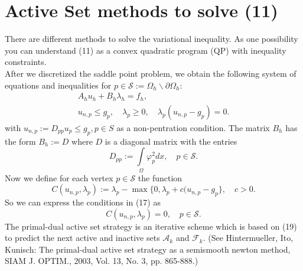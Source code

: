 \documentclass{article}
\begin{document}
\section{Active Set methods to solve (11)}

There are different methods to solve the variational inequality. As one possibility you can understand (11) as a convex quadratic program (QP) with inequality constraints.\\
After we discretized the saddle point problem, we obtain the following system of equations and inequalities for $p\in\mathcal{S}:=\Omega_h\backslash\partial\Omega_h$:
\begin{eqnarray}
 &A_h u_h + B_h\lambda_h = f_h,&\\
 &u_{n,p} \leq g_p,\quad \lambda_p \geq 0,\quad \lambda_p(u_{n,p} - g_p) = 0.&
\end{eqnarray}
with $u_{n,p}:=D_{pp} u_p\leq g_p, p\in S$ as a non-pentration condition. The matrix $B_h$ has the form $B_h:=D$ where $D$ is a diagonal matrix with the entries
\begin{equation}
 D_{pp} := \int\limits_{\Omega}\varphi_p^2 dx,\quad p\in\mathcal{S}.
\end{equation}
Now we define for each vertex $p\in \mathcal{S}$ the function
\begin{equation}
 C(u_{n,p},\lambda_p):=\lambda_p - \max\lbrace 0, \lambda_p + c( u_{n,p} - g_p\rbrace,\quad c>0.
\end{equation}
So we can express the conditions in (17) as
\begin{equation}
 C(u_{n,p},\lambda_p) = 0,\quad p\in\mathcal{S}.
\end{equation}
The primal-dual active set strategy is an iterative scheme which is based on (19) to predict the next active and inactive sets $\mathcal{A}_k$ and $\mathcal{F}_k$. (See Hintermueller, Ito, Kunisch: The primal-dual active set strategy as a semismooth newton method, SIAM J. OPTIM., 2003, Vol. 13, No. 3, pp. 865-888.)\\
\end{document}
